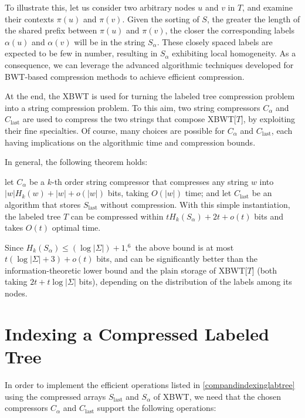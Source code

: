 To illustrate this, let us consider two arbitrary nodes $u$ and $v$ in $T$, and examine their contexts $\pi(u)$ and $\pi(v)$. Given the sorting of $S$, the greater the length of the shared prefix between $\pi(u)$ and $\pi(v)$, the closer the corresponding labels $\alpha(u)$ and $\alpha(v)$ will be in the string $S_{\alpha}$. These closely spaced labels are expected to be few in number, resulting in $S_{\alpha}$ exhibiting local homogeneity. As a consequence, we can leverage the advanced algorithmic techniques developed for BWT-based compression methods to achieve efficient compression.

At the end, the XBWT is used for turning the labeled tree compression problem into a string compression problem. To this aim, two string compressors
$C_{\alpha}$ and $C_{\text{last}}$ are used to compress the two strings that compose XBWT[$T$], by exploiting their fine specialties. Of course, many choices are possible for $C_{\alpha}$ and $C_{\text{last}}$, each having implications on the algorithmic time and compression bounds.

In general, the following theorem holds:

\begin{theorem}
    let $C_{\alpha}$ be a $k$-th order string compressor that compresses any string $w$ into $|w|H_k(w) + |w| + o(|w|)$ bits, taking $O(|w|)$ time; and let $C_{\text{last}}$ be an algorithm that stores $S_{\text{last}}$ without compression. With this simple instantiation, the labeled tree $T$ can be compressed within $t H_k(S_{\alpha}) + 2t + o(t)$ bits and takes $O(t)$ optimal time.
\end{theorem}

Since $H_k(S_\alpha) \leq (\log |\Sigma|) + 1,^6$ the above bound is at most $t(\log |\Sigma| + 3) + o(t)$ bits, and can be significantly better than the information-theoretic lower bound and the plain storage of XBWT[$T$] (both taking $2t + t \log|\Sigma|$ bits), depending on the distribution of the labels among its nodes.

\section{Indexing a Compressed Labeled Tree} \label{sec:xbwt_operations}
In order to implement the efficient operations listed in \cref{compandindexinglabtree} using the compressed arrays $S_{\text{last}}$ and $S_{\alpha}$ of XBWT, we need that the chosen compressors $C_{\alpha}$ and $C_{\text{last}}$ support the following operations:

